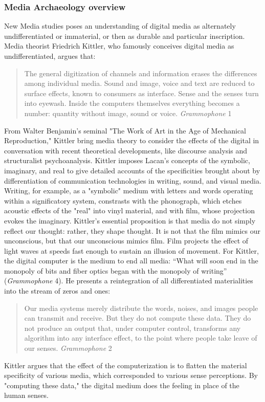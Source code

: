 \documentclass[11pt]{article}
\begin{document}
\subsubsection{Media Archaeology overview}
\label{sec:org9037a06}
New Media studies poses an understanding of digital media as
alternately undifferentiated or immaterial, or then as durable and
particular inscription. Media theorist Friedrich Kittler, who famously
conceives digital media as undifferentiated, argues that:
\begin{quote}
The general digitization of channels and information erases the
differences among individual media. Sound and image, voice and text
are reduced to surface effects, known to consumers as interface. Sense
and the senses turn into eyewash. Inside the computers themselves
everything becomes a number: quantity without image, sound or
voice. \emph{Grammophone} 1
\end{quote}
From Walter Benjamin's seminal "The Work of Art in the Age of
Mechanical Reproduction," Kittler bring media theory to consider the
effects of the digital in conversation with recent theoretical
developments, like discourse analysis and structuralist
psychoanalysis. Kittler imposes Lacan's concepts of the symbolic,
imaginary, and real to give detailed accounts of the specificities
brought about by differentiation of communication technologies in
writing, sound, and visual media. Writing, for example, as a
"symbolic" medium with letters and words operating within a
significatory system, constrasts with the phonograph, which etches
acoustic effects of the "real" into vinyl material, and with film,
whose projection evokes the imaginary. Kittler's essential proposition
is that media do not simply reflect our thought: rather, they shape
thought. It is not that the film mimics our unconscious, but that our
unconscious mimics film. Film projects the effect of light waves at
speeds fast enough to sustain an illusion of movement. For Kittler,
the digital computer is the medium to end all media: “What will soon
end in the monopoly of bits and fiber optics began with the monopoly
of writing” (\emph{Grammophone} 4). He presents a reintegration of all
differentiated materialities into the stream of zeros and ones:
\begin{quote}
Our media systems merely distribute the words, noises, and images
people can transmit and receive. But they do not compute these
data. They do not produce an output that, under computer control,
transforms any algorithm into any interface effect, to the point where
people take leave of our senses. \emph{Grammophone} 2
\end{quote}
Kittler argues that the effect of the computerization is to flatten
the material specificity of various media, which corresponded to
various sense perceptions. By "computing these data," the digital
medium does the feeling in place of the human senses.
\end{document}
